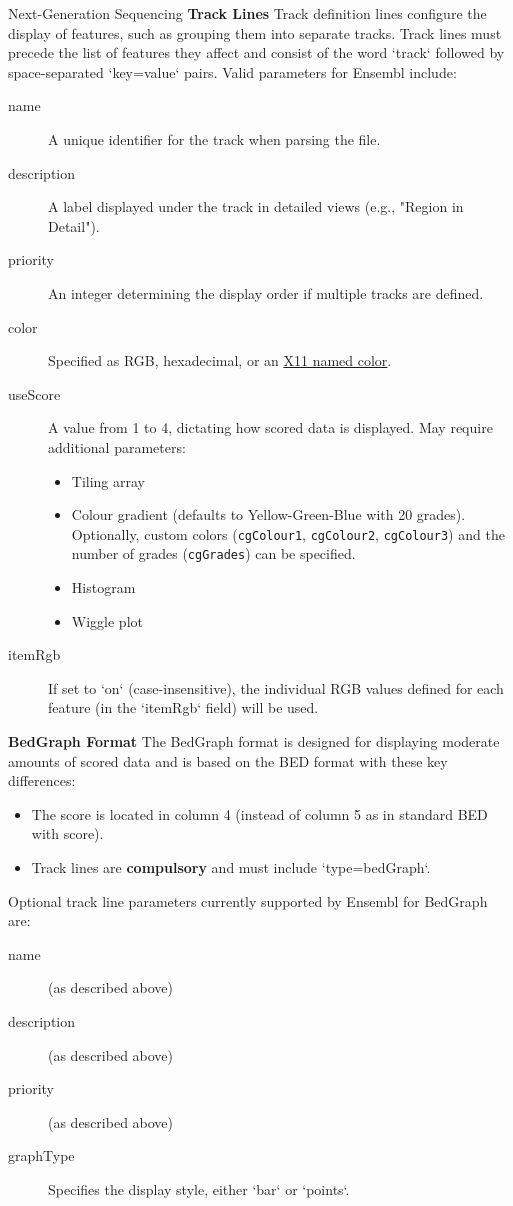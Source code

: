\documentclass[twocolumn]{article}
\begin{document}
\begin{literaturepaper}{Next-Generation Sequencing \cite{gencore_how_sequencing_works}}
\textbf{Track Lines}
Track definition lines configure the display of features, such as grouping them into separate tracks. Track lines must precede the list of features they affect and consist of the word `track` followed by space-separated `key=value` pairs. Valid parameters for Ensembl include:

\begin{description}
    \item[name] A unique identifier for the track when parsing the file.
    \item[description] A label displayed under the track in detailed views (e.g., "Region in Detail").
    \item[priority] An integer determining the display order if multiple tracks are defined.
    \item[color] Specified as RGB, hexadecimal, or an \href{https://www.X.org/releases/X11R7.6/doc/xorg-docs/specs/RGBColorNames.txt}{X11 named color}.
    \item[useScore] A value from 1 to 4, dictating how scored data is displayed. May require additional parameters:
    \begin{itemize}
        \item Tiling array
        \item Colour gradient (defaults to Yellow-Green-Blue with 20 grades). Optionally, custom colors (\texttt{cgColour1}, \texttt{cgColour2}, \texttt{cgColour3}) and the number of grades (\texttt{cgGrades}) can be specified.
        \item Histogram
        \item Wiggle plot
    \end{itemize}
    \item[itemRgb] If set to `on` (case-insensitive), the individual RGB values defined for each feature (in the `itemRgb` field) will be used.
\end{description}

\textbf{BedGraph Format}
The BedGraph format is designed for displaying moderate amounts of scored data and is based on the BED format with these key differences:
\begin{itemize}
    \item The score is located in column 4 (instead of column 5 as in standard BED with score).
    \item Track lines are \textbf{compulsory} and must include `type=bedGraph`.
\end{itemize}
Optional track line parameters currently supported by Ensembl for BedGraph are:
\begin{description}
    \item[name] (as described above)
    \item[description] (as described above)
    \item[priority] (as described above)
    \item[graphType] Specifies the display style, either `bar` or `points`.
\end{description}

\end{literaturepaper}
\end{document}
